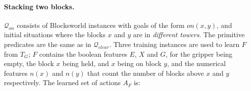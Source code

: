 \documentclass[letterpaper]{article} %
\newcommand{\Q}{\mathcal{Q}}
\begin{document}
\paragraph{Stacking two blocks.}
$\Q_{on}$ consists  of Blocksworld instances with goals of the form $on(x,y)$,
and initial situations  where the blocks $x$ and $y$ are in \emph{different towers}.
The primitive predicates are the same as in $\Q_{clear}$.
Three training instances are used to learn $F$ from $T_G$;
$F$ contains
%
the boolean features $E$, $X$ and $G$, for the gripper being empty, the
block $x$ being held, and $x$ being on block $y$, and the
numerical features $n(x)$ and $n(y)$ that count the number of blocks
above $x$ and $y$ respectively.
%
The learned set of actions $A_F$ is:
\end{document}
